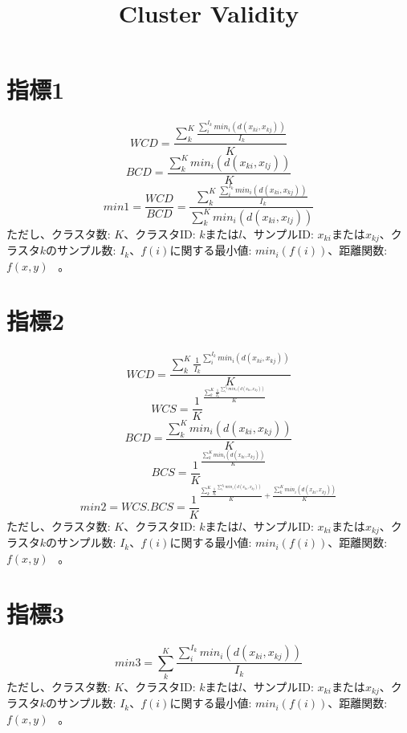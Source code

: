 \documentclass{article}
\title{Cluster Validity}
\begin{document}
\maketitle
\section{指標1}
\begin{equation}
WCD=\frac{\sum_{k}^{K}{\frac{\sum_{i}^{I_k}{min_i(d(x_{ki},x_{kj}))}}{I_k}}}{K}
\end{equation}
\begin{equation}
BCD=\frac{\sum_{k}^{K}{min_i(d(x_{ki},x_{lj}))}}{K}
\end{equation}
\begin{equation}
min1=\frac{WCD}{BCD}=\frac{\sum_{k}^{K}{\frac{\sum_{i}^{I_k}{min_i(d(x_{ki},x_{kj}))}}{I_k}}}{\sum_{k}^{K}{min_i(d(x_{ki},x_{lj}))}}
\end{equation}
ただし、クラスタ数: $K$、クラスタID: $k$または$l$、サンプルID: $x_{ki}$または$x_{kj}$、クラスタ$k$のサンプル数: $I_k$、$f(i)$に関する最小値: $min_i(f(i))$、距離関数:$f(x,y)$  \ 。

\section{指標2}
\begin{equation}
WCD=\frac{\sum_{k}^{K}{{\frac{1}{I_k}}^{\sum_{i}^{I_k}{min_i(d(x_{ki},x_{kj}))}}}}{K}
\end{equation}
\begin{equation}
WCS={\frac{1}{K}}^{\frac{\sum_{k}^{K}{{\frac{1}{I_k}}^{\sum_{i}^{I_k}{min_i(d(x_{ki},x_{kj}))}}}}{K}}
\end{equation}
\begin{equation}
BCD=\frac{\sum_{k}^{K}{min_i(d(x_{ki},x_{kj}))}}{K}
\end{equation}
\begin{equation}
BCS={\frac{1}{K}}^{\frac{\sum_{k}^{K}{min_i(d(x_{ki},x_{kj}))}}{K}}
\end{equation}
\begin{equation}
min2=WCS . BCS={\frac{1}{K}}^{\frac{\sum_{k}^{K}{{\frac{1}{I_k}}^{\sum_{i}^{I_k}{min_i(d(x_{ki},x_{kj}))}}}}{K} + \frac{\sum_{k}^{K}{min_i(d(x_{ki},x_{kj}))}}{K}}
\end{equation}
ただし、クラスタ数: $K$、クラスタID: $k$または$l$、サンプルID: $x_{ki}$または$x_{kj}$、クラスタ$k$のサンプル数: $I_k$、$f(i)$に関する最小値: $min_i(f(i))$、距離関数:$f(x,y)$  \ 。

\section{指標3}
\begin{equation}
min3={\sum_{k}^{K}{\frac{\sum_{i}^{I_k}{min_i(d(x_{ki},x_{kj}))}}{I_k}}}
\end{equation}
ただし、クラスタ数: $K$、クラスタID: $k$または$l$、サンプルID: $x_{ki}$または$x_{kj}$、クラスタ$k$のサンプル数: $I_k$、$f(i)$に関する最小値: $min_i(f(i))$、距離関数:$f(x,y)$  \ 。
\end{document}
